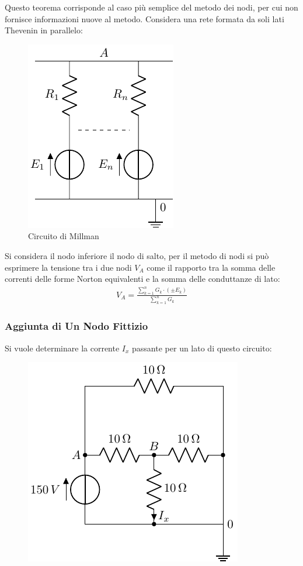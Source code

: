 \documentclass{article}
\numberwithin{equation}{subsection}
\begin{document}
Questo teorema corrisponde al caso più semplice del metodo dei nodi, per cui non fornisce informazioni nuove al metodo. Considera una rete formata da soli lati Thevenin in 
parallelo:
\begin{figure}[H]%
    \centering
    \includegraphics{circuito-millman.pdf}
    \caption{Circuito di Millman}
    \label{fig:circuito-millman}
\end{figure}
Si considera il nodo inferiore il nodo di salto, per il metodo di nodi si può esprimere la tensione tra i due nodi $V_A$ come il rapporto tra la somma delle correnti delle 
forme Norton equivalenti e la somma delle conduttanze di lato:
\begin{gather*}
    V_A=\displaystyle\frac{\sum_{k=1}^nG_k\cdot(\pm E_k)}{\sum_{k=1}^nG_k}
\end{gather*}

\subsubsection{Aggiunta di Un Nodo Fittizio}

Si vuole determinare la corrente $I_x$ passante per un lato di questo circuito:
\begin{figure}[H]%
    \centering
    \includegraphics{circuito-3.pdf}
    \label{fig:circuito-3}
\end{figure}
\end{document}
